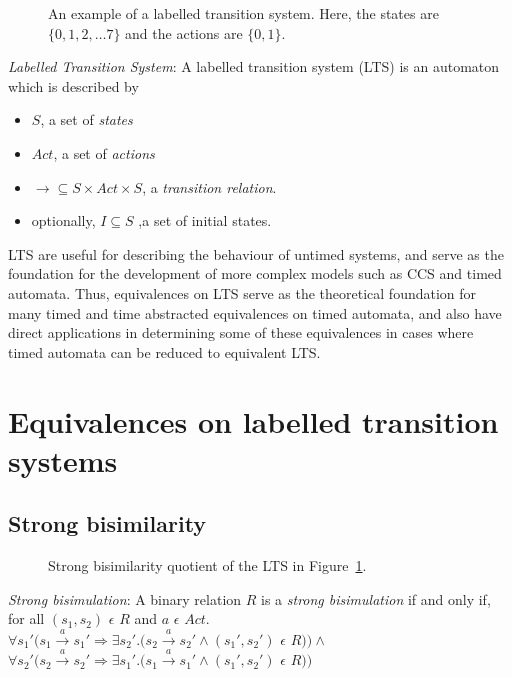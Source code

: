 \documentclass[a4paper]{llncs}
\begin{document}
\begin{SCfigure}
  \centering
  \def\svgwidth{0.3\columnwidth}
  
  \caption{An example of a labelled transition system. Here, the
    states are $\{0, 1, 2, \ldots 7\}$ and the actions are $\{0,
    1\}$.}
  \label{lts01}
\end{SCfigure}

\begin{definition}
  \emph{Labelled Transition System}: A labelled transition system (LTS)
  \cite{Keller:1976:FVP:360248.360251} is an automaton which is
  described by
  \begin{itemize}
  \item $S$, a set of \emph{states} 
  \item $Act$, a set of \emph{actions}
  \item $\rightarrow \subseteq S \times Act \times S$, a \emph{transition
    relation}.
  \item optionally, $I \subseteq S$ ,a set of initial states.
  \end{itemize}
\end{definition}

LTS are useful for describing the behaviour of untimed systems, and
serve as the foundation for the development of more complex models
such as CCS and timed automata. Thus, equivalences on LTS serve
as the theoretical foundation for many timed and time abstracted
equivalences on timed automata, and also have direct applications in
determining some of these equivalences in cases where timed automata
can be reduced to equivalent LTS.

\section{Equivalences on labelled transition systems}

\subsection{Strong bisimilarity}

\begin{SCfigure}
  \centering
  \def\svgwidth{0.5\columnwidth}
  
  \caption{Strong bisimilarity quotient of the LTS in Figure~\ref{lts01}.}
\end{SCfigure}

\begin{definition} 
  \emph{Strong bisimulation}: A binary relation $R$ is a \textit{strong
    bisimulation} if and only if, for all $(s_1, s_2)$ $\epsilon$ $R$ and $a$ $\epsilon$ $Act .$\\
  $\forall s_1' (s_1 \xrightarrow{a} s_1' \Rightarrow \exists s_2'
  . (s_2 \xrightarrow{a} s_2' \wedge (s_1', s_2')$ $\epsilon$ $R ) )
  \wedge $ \\
  $\forall s_2' (s_2 \xrightarrow{a} s_2' \Rightarrow \exists s_1'
  . (s_1 \xrightarrow{a} s_1' \wedge (s_1', s_2')$ $\epsilon$ $R ) )$
\end{definition}
\end{document}
